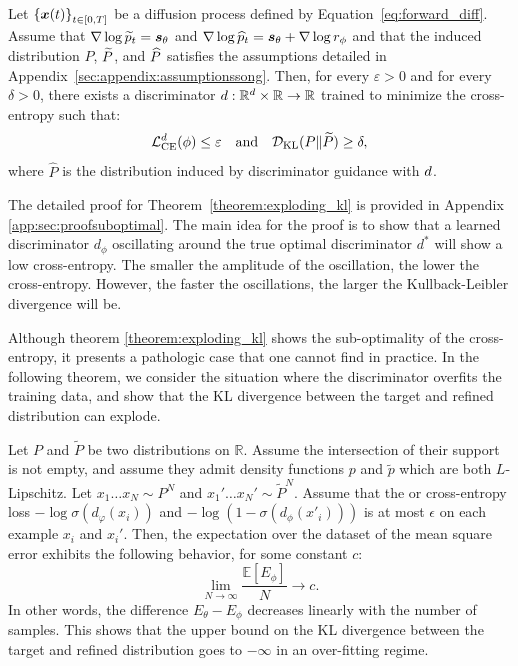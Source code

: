\begin{theorem}\label{theorem:exploding_kl}
    Let $\left\{\boldsymbol{x}(t)\right\}_{t\in[0, T]}$ be a diffusion process defined by Equation~\ref{eq:forward_diff}. Assume that $\nabla \log \widetilde p_t= \boldsymbol{s}_\theta$ and $\nabla \log \widehat p_t =\boldsymbol{s}_\theta +\nabla \log r_\phi $ and that the induced distribution $P$, $\widetilde P$, and $\widehat P$ satisfies the assumptions detailed in Appendix~\ref{sec:appendix:assumptionssong}. Then, for every $\varepsilon>0$ and for every $\delta>0$, there exists a discriminator $d:\mathbb{R}^d\times\mathbb{R}\to\mathbb{R}$ trained to minimize the cross-entropy such that:
    \begin{equation}
        \mathcal{L}_{\mathrm{CE}}^{d}(\phi)\leq \varepsilon \quad \mbox{and} \quad \mathcal{D}_{\mathrm{KL}}(P\Vert \widetilde{P}) \geq \delta,
    \end{equation}
    where $\widehat{P}$ is the distribution induced by discriminator guidance with $d$.
\end{theorem}
\begin{hproof}The detailed proof for Theorem~\ref{theorem:exploding_kl} is provided in Appendix \ref{app:sec:proofsuboptimal}. The main idea for the proof is to show that a learned discriminator $d_{\phi}$ oscillating around the true optimal discriminator $d^*$ will show a low cross-entropy. The smaller the amplitude of the oscillation, the lower the cross-entropy. However, the faster the oscillations, the larger the Kullback-Leibler divergence will be. \end{hproof}
Although theorem \ref*{theorem:exploding_kl} shows the sub-optimality of the cross-entropy, it presents a pathologic case that one cannot find in practice. In the following theorem, we consider the situation where the discriminator overfits the training data, and show that the KL divergence between the target and refined distribution can explode.
\begin{theorem}\label{theorem:expectation_exploding}
    Let $P$ and $\widetilde{P}$ be two
distributions on $\mathbb{R}$. Assume the intersection of their support
is not empty, and assume they admit density functions $p$ and $\tilde{p}$
which are both $L$-Lipschitz. Let $x_{1}\ldots x_{N}\sim P^{N}$
and $x_{1}'\ldots x_{N}'\sim\tilde{P}^{N}$. Assume that the or cross-entropy loss $-\log\sigma\left(d_{\varphi}(x_{i})\right)$
and $-\log\left(1-\sigma\left(d_{\phi}(x'_{i})\right)\right)$
is at most $\epsilon$ on each example $x_{i}$ and $x_{i}'$. Then,
the expectation over the dataset of the mean square error exhibits
the following behavior, for some constant $c$:
\begin{equation}
    \lim_{N\rightarrow\infty}\frac{\mathbb{E}\left[E_{\phi}\right]}{N}\to c.
\end{equation}
In other words, the difference $E_{\theta} - E_{\phi}$  decreases linearly with the number of samples. This shows that the upper bound on the KL divergence between the target and refined distribution goes to $-\infty$ in an over-fitting regime.
\end{theorem}
